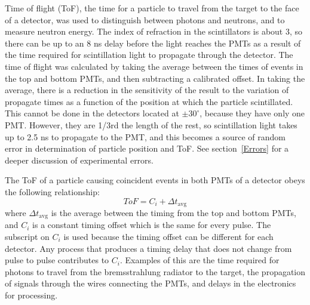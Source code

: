 Time of flight (ToF), the time for a particle to travel from the target to the face of a detector, was used to distinguish between photons and neutrons, and to measure neutron energy.
The index of refraction in the scintillators is about 3, so there can be up to an 8 ns delay before the light reaches the PMTs as a result of the time required for scintillation light to propagate through the detector.
The time of flight was calculated by taking the average between the times of events in the top and bottom PMTs, and then subtracting a calibrated offset.
In taking the average, there is a reduction in the sensitivity of the result to the variation of propagate times as a function of the position at which the particle scintillated.
This cannot be done in the detectors located at $\pm30^{\circ}$, because they have only one PMT.
However, they are 1/3rd the length of the rest, so scintillation light takes up to 2.5 ns to propagate to the PMT, and this becomes a source of random error in determination of particle position and ToF.
See section~\ref{Errors} for a deeper discussion of experimental errors.

The ToF of a particle causing coincident events in both PMTs of a detector obeys the following relationship:
\begin{displaymath}
ToF = C_i + \Delta t_{\text{avg}} 
\end{displaymath}
where $\Delta t_{\text{avg}} $ is the average between the timing from the top and bottom PMTs, and $C_i$ is a constant timing offset which is the same for every pulse.
The subscript on $C_i$ is used because the timing offset can be different for each detector.
Any process that produces a timing delay that does not change from pulse to pulse contributes to $C_{i}$.
Examples of this are the time required for photons to travel from the bremsstrahlung radiator to the target, the propagation of signals through the wires connecting the PMTs, and delays in the electronics for processing.

